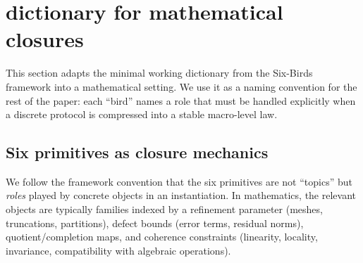 \section{\SBT dictionary for mathematical closures}
\label{sec:dictionary}

This section adapts the minimal working dictionary from the Six-Birds framework \cite{SixBirdsFramework} into a mathematical setting.
We use it as a naming convention for the rest of the paper: each ``bird'' names a role that must be handled explicitly when a discrete protocol is compressed into a stable macro-level law.

\subsection{Six primitives as closure mechanics}
We follow the framework convention that the six primitives are not ``topics'' but \emph{roles} played by concrete objects in an instantiation.
In mathematics, the relevant objects are typically families indexed by a refinement parameter (meshes, truncations, partitions), defect bounds (error terms, residual norms), quotient/completion maps, and coherence constraints (linearity, locality, invariance, compatibility with algebraic operations).

